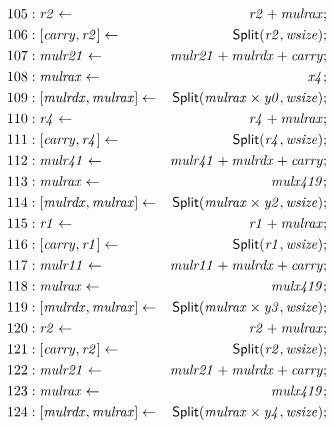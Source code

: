{\begin{multicols}{2}
\begin{align*}
105 &: \mathit{r2} \leftarrow & \mathit{r2} + \mathit{mulrax}; \\
106 &: \concat{\mathit{carry}}{\mathit{r2}} \leftarrow & \dslcode{Split}(\mathit{r2}, \mathit{wsize}); \\
107 &: \mathit{mulr21} \leftarrow & \mathit{mulr21} + \mathit{mulrdx} + \mathit{carry}; \\
108 &: \mathit{mulrax} \leftarrow & \mathit{x4}; \\
109 &: \concat{\mathit{mulrdx}}{\mathit{mulrax}} \leftarrow & \dslcode{Split}(\mathit{mulrax} \times \mathit{y0}, \mathit{wsize}); \\
110 &: \mathit{r4} \leftarrow & \mathit{r4} + \mathit{mulrax}; \\
111 &: \concat{\mathit{carry}}{\mathit{r4}} \leftarrow & \dslcode{Split}(\mathit{r4}, \mathit{wsize}); \\
112 &: \mathit{mulr41} \leftarrow & \mathit{mulr41} + \mathit{mulrdx} + \mathit{carry}; \\
113 &: \mathit{mulrax} \leftarrow & \mathit{mulx419}; \\
114 &: \concat{\mathit{mulrdx}}{\mathit{mulrax}} \leftarrow & \dslcode{Split}(\mathit{mulrax} \times \mathit{y2}, \mathit{wsize}); \\
115 &: \mathit{r1} \leftarrow & \mathit{r1} + \mathit{mulrax}; \\
116 &: \concat{\mathit{carry}}{\mathit{r1}} \leftarrow & \dslcode{Split}(\mathit{r1}, \mathit{wsize}); \\
117 &: \mathit{mulr11} \leftarrow & \mathit{mulr11} + \mathit{mulrdx} + \mathit{carry}; \\
118 &: \mathit{mulrax} \leftarrow & \mathit{mulx419}; \\
119 &: \concat{\mathit{mulrdx}}{\mathit{mulrax}} \leftarrow & \dslcode{Split}(\mathit{mulrax} \times \mathit{y3}, \mathit{wsize}); \\
120 &: \mathit{r2} \leftarrow & \mathit{r2} + \mathit{mulrax}; \\
121 &: \concat{\mathit{carry}}{\mathit{r2}} \leftarrow & \dslcode{Split}(\mathit{r2}, \mathit{wsize}); \\
122 &: \mathit{mulr21} \leftarrow & \mathit{mulr21} + \mathit{mulrdx} + \mathit{carry}; \\
123 &: \mathit{mulrax} \leftarrow & \mathit{mulx419}; \\
124 &: \concat{\mathit{mulrdx}}{\mathit{mulrax}} \leftarrow & \dslcode{Split}(\mathit{mulrax} \times \mathit{y4}, \mathit{wsize}); \\

\end{align*}
\end{multicols}}
